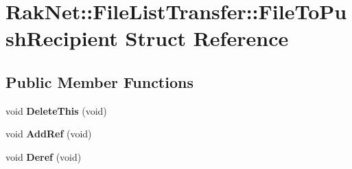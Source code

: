 \hypertarget{struct_rak_net_1_1_file_list_transfer_1_1_file_to_push_recipient}{\section{Rak\-Net\-:\-:File\-List\-Transfer\-:\-:File\-To\-Push\-Recipient Struct Reference}
\label{struct_rak_net_1_1_file_list_transfer_1_1_file_to_push_recipient}
}
\subsection*{Public Member Functions}
\begin{DoxyCompactItemize}
\item 
\hypertarget{struct_rak_net_1_1_file_list_transfer_1_1_file_to_push_recipient_a377cc551743a8ba73b7de21bc280f6b8}{void {\bfseries Delete\-This} (void)}\label{struct_rak_net_1_1_file_list_transfer_1_1_file_to_push_recipient_a377cc551743a8ba73b7de21bc280f6b8}

\item 
\hypertarget{struct_rak_net_1_1_file_list_transfer_1_1_file_to_push_recipient_a3bcad595ed012e864b1c52d4446d0ea0}{void {\bfseries Add\-Ref} (void)}\label{struct_rak_net_1_1_file_list_transfer_1_1_file_to_push_recipient_a3bcad595ed012e864b1c52d4446d0ea0}

\item 
\hypertarget{struct_rak_net_1_1_file_list_transfer_1_1_file_to_push_recipient_a086de110303b92a1a7102d96158a4a2c}{void {\bfseries Deref} (void)}\label{struct_rak_net_1_1_file_list_transfer_1_1_file_to_push_recipient_a086de110303b92a1a7102d96158a4a2c}

\end{DoxyCompactItemize}
